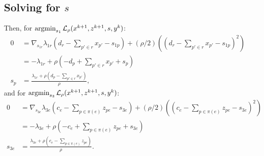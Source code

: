 \documentclass[11pt]{article}
\begin{document}
\subsection{Solving for $s$}
Then, for $\operatorname*{argmin}_{s_1} \mathcal{L}_\rho(x^{k+1},z^{k+1},s,y^k)$:
\begin{align*}
0
&= \nabla_{s_{1r}}\lambda_{1r}(d_r - \sum_{p'\in r}x_{p'} - s_{1p})
    + (\rho/2)((d_r - \sum_{p'\in r}x_{p'} - s_{1p})^2)\\
&= -\lambda_{1r} + \rho(-d_p + \sum_{p'\in r}x_{p'} + s_p)\\
s_{p} &= \frac{\lambda_{1r} + \rho(d_p - \sum_{p'\in r}x_{p'})}{\rho},
\end{align*}
and for $\operatorname*{argmin}_{s_3} \mathcal{L}_\rho(x^{k+1},z^{k+1},s,y^k)$:
\begin{align*}
0
&= \nabla_{s_{3e}} \lambda_{3e}(c_e - \sum_{p\in\pi(e)} z_{pe} - s_{3e})
    + (\rho/2)((c_e - \sum_{p\in\pi(e)} z_{pe} - s_{3e})^2)\\
&= -\lambda_{3e} + \rho(-c_e + \sum_{p\in\pi(e)} z_{pe} + s_{3e})\\
s_{3e} &= \frac{\lambda_{3e} + \rho(c_e - \sum_{p\in\pi(e)}z_{pe})}{\rho}.
\end{align*}
\end{document}

